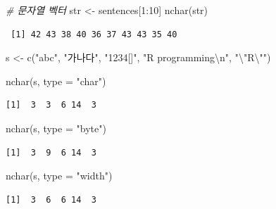 \documentclass[
  11pt,
]{krantz}
\newenvironment{Shaded}{\begin{snugshade}}{\end{snugshade}}
\newcommand{\AttributeTok}[1]{\textcolor[rgb]{0.61,0.61,0.61}{#1}}
\newcommand{\CommentTok}[1]{\textcolor[rgb]{0.37,0.37,0.37}{\textit{#1}}}
\newcommand{\DecValTok}[1]{\textcolor[rgb]{0.06,0.06,0.06}{#1}}
\newcommand{\FunctionTok}[1]{\textcolor[rgb]{0,0,0}{#1}}
\newcommand{\NormalTok}[1]{#1}
\newcommand{\OtherTok}[1]{\textcolor[rgb]{0.37,0.37,0.37}{#1}}
\newcommand{\SpecialCharTok}[1]{\textcolor[rgb]{0,0,0}{#1}}
\newcommand{\StringTok}[1]{\textcolor[rgb]{0.5,0.5,0.5}{#1}}
\begin{document}
\begin{Shaded}
\begin{Highlighting}[]
\CommentTok{\# 문자열 벡터}
\NormalTok{str }\OtherTok{\textless{}{-}}\NormalTok{ sentences[}\DecValTok{1}\SpecialCharTok{:}\DecValTok{10}\NormalTok{]}
\FunctionTok{nchar}\NormalTok{(str)}
\end{Highlighting}
\end{Shaded}

\begin{verbatim}
 [1] 42 43 38 40 36 37 43 43 35 40
\end{verbatim}

\begin{Shaded}
\begin{Highlighting}[]
\NormalTok{s }\OtherTok{\textless{}{-}} \FunctionTok{c}\NormalTok{(}\StringTok{"abc"}\NormalTok{, }\StringTok{"가나다"}\NormalTok{, }\StringTok{"1234[]"}\NormalTok{, }\StringTok{"R programming}\SpecialCharTok{\textbackslash{}n}\StringTok{"}\NormalTok{, }\StringTok{"}\SpecialCharTok{\textbackslash{}"}\StringTok{R}\SpecialCharTok{\textbackslash{}"}\StringTok{"}\NormalTok{)}

\FunctionTok{nchar}\NormalTok{(s, }\AttributeTok{type =} \StringTok{"char"}\NormalTok{)}
\end{Highlighting}
\end{Shaded}

\begin{verbatim}
[1]  3  3  6 14  3
\end{verbatim}

\begin{Shaded}
\begin{Highlighting}[]
\FunctionTok{nchar}\NormalTok{(s, }\AttributeTok{type =} \StringTok{"byte"}\NormalTok{)}
\end{Highlighting}
\end{Shaded}

\begin{verbatim}
[1]  3  9  6 14  3
\end{verbatim}

\begin{Shaded}
\begin{Highlighting}[]
\FunctionTok{nchar}\NormalTok{(s, }\AttributeTok{type =} \StringTok{"width"}\NormalTok{)}
\end{Highlighting}
\end{Shaded}

\begin{verbatim}
[1]  3  6  6 14  3
\end{verbatim}
\end{document}

